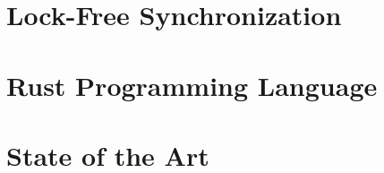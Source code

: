 \section{Lock-Free Synchronization}\label{sec:lock-free}

\section{Rust Programming Language}\label{sec:rust}

\section{State of the Art}\label{sec:state-of-the-art}